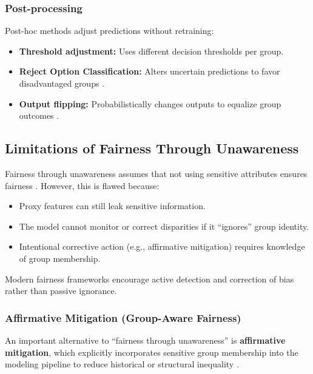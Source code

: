 \subsubsection{Post-processing}

Post-hoc methods adjust predictions without retraining:

\begin{itemize}
    \item \textbf{Threshold adjustment:} Uses different decision thresholds per group.
    \item \textbf{Reject Option Classification:} Alters uncertain predictions to favor disadvantaged groups \cite{kamiran2012data}.
    \item \textbf{Output flipping:} Probabilistically changes outputs to equalize group outcomes \cite{hardt2016equality}.
\end{itemize}

\subsection{Limitations of Fairness Through Unawareness}

Fairness through unawareness assumes that not using sensitive attributes ensures fairness \cite{corbett2018measure}. However, this is flawed because:

\begin{itemize}
    \item Proxy features can still leak sensitive information.
    \item The model cannot monitor or correct disparities if it “ignores” group identity.
    \item Intentional corrective action (e.g., affirmative mitigation) requires knowledge of group membership.
\end{itemize}

Modern fairness frameworks encourage active detection and correction of bias rather than passive ignorance.

\subsubsection*{Affirmative Mitigation (Group-Aware Fairness)}

An important alternative to ``fairness through unawareness'' is \textbf{affirmative mitigation}, which explicitly incorporates sensitive group membership into the modeling pipeline to reduce historical or structural inequality \cite{corbett2018measure,hardt2016equality,kamiran2012data}.

